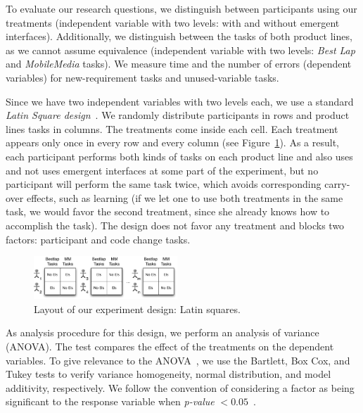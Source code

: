 \label{sec:design}

To evaluate our research questions, we distinguish between participants using our treatments (independent variable with two levels: with and without emergent interfaces). Additionally, we distinguish between the tasks of both product lines, as we cannot assume equivalence (independent variable with two levels: \textit{Best Lap} and \textit{MobileMedia} tasks). We measure time and the number of errors (dependent variables) for new-requirement tasks and unused-variable tasks.

Since we have two independent variables with two levels each, we use a standard \emph{Latin Square design}~\cite{box-statistics-for-experimenters}. We randomly distribute participants in rows and product lines tasks in columns. The treatments come inside each cell. Each treatment appears only once in every row and every column (see Figure~\ref{fig:latin-squares}). As a result, each participant performs both kinds of tasks on each product line and also uses and not uses emergent interfaces at some part of the experiment, but no participant will perform the same task twice, which avoids corresponding carry-over effects, such as learning (if we let one to use both treatments in the same task, we would favor the second treatment, since she already knows how to accomplish the task). The design does not favor any treatment and blocks two factors: participant and code change tasks.

\begin{figure}[tp]
    \centering \includegraphics[width=0.48\textwidth]{images/Latin-squares.pdf}
    \caption{Layout of our experiment design: Latin squares.}
    \label{fig:latin-squares}
\end{figure}

As analysis procedure for this design, we perform an analysis of variance (ANOVA). The test compares the effect of the treatments on the dependent variables. To give relevance to the ANOVA~\cite{box-statistics-for-experimenters}, we use the Bartlett, Box Cox, and Tukey tests to verify variance homogeneity, normal distribution, and model additivity, respectively. We follow the convention of considering a factor as being significant to the response variable when \textit{p-value} $< 0.05$~\cite{box-statistics-for-experimenters}.

